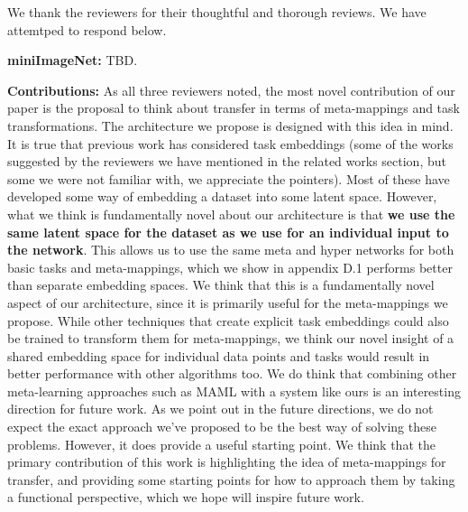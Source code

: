 \documentclass{article}
\begin{document}
We thank the reviewers for their thoughtful and thorough reviews. We have attemtped to respond below. \par
\textbf{miniImageNet:} TBD. \par
{}
\textbf{Contributions:} As all three reviewers noted, the most novel contribution of our paper is the proposal to think about transfer in terms of meta-mappings and task transformations. The architecture we propose is designed with this idea in mind. It is true that previous work has considered task embeddings (some of the works suggested by the reviewers we have mentioned in the related works section, but some we were not familiar with, we appreciate the pointers). Most of these have developed some way of embedding a dataset into some latent space. However, what we think is fundamentally novel about our architecture is that \textbf{we use the same latent space for the dataset as we use for an individual input to the network}. This allows us to use the same meta and hyper networks for both basic tasks and meta-mappings, which we show in appendix D.1 performs better than separate embedding spaces. We think that this is a fundamentally novel aspect of our architecture, since it is primarily useful for the meta-mappings we propose. While other techniques that create explicit task embeddings could also be trained to transform them for meta-mappings, we think our novel insight of a shared embedding space for individual data points and tasks would result in better performance with other algorithms too. We do think that combining other meta-learning approaches such as MAML with a system like ours is an interesting direction for future work. As we point out in the future directions, we do not expect the exact approach we've proposed to be the best way of solving these problems. However, it does provide a useful starting point. We think that the primary contribution of this work is highlighting the idea of meta-mappings for transfer, and providing some starting points for how to approach them by taking a functional perspective, which we hope will inspire future work. \par
{}
\end{document}
